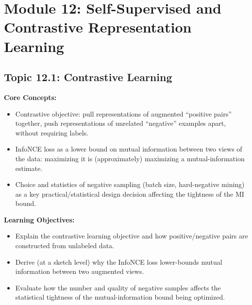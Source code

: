 \documentclass[11pt]{article}
\begin{document}
\section{Module 12: Self-Supervised and Contrastive Representation Learning}

\subsection{Topic 12.1: Contrastive Learning}

\textbf{Core Concepts:}
\begin{itemize}
  \item Contrastive objective: pull representations of augmented ``positive pairs'' together, push representations of unrelated ``negative'' examples apart, without requiring labels.
  \item InfoNCE loss as a lower bound on mutual information between two views of the data: maximizing it is (approximately) maximizing a mutual-information estimate.
  \item Choice and statistics of negative sampling (batch size, hard-negative mining) as a key practical/statistical design decision affecting the tightness of the MI bound.
\end{itemize}

\textbf{Learning Objectives:}
\begin{itemize}
  \item Explain the contrastive learning objective and how positive/negative pairs are constructed from unlabeled data.
  \item Derive (at a sketch level) why the InfoNCE loss lower-bounds mutual information between two augmented views.
  \item Evaluate how the number and quality of negative samples affects the statistical tightness of the mutual-information bound being optimized.
\end{itemize}
\end{document}

